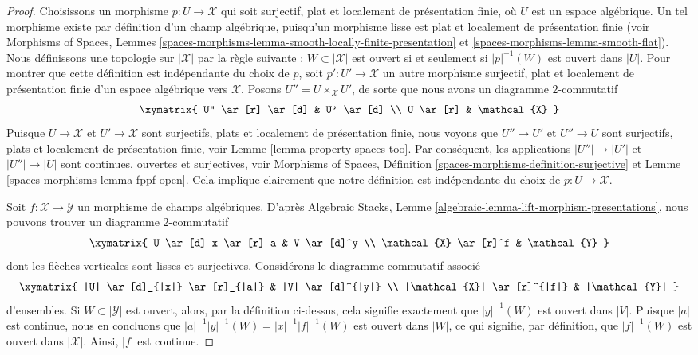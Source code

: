 \begin{proof}
Choisissons un morphisme $p : U \to \mathcal{X}$ qui soit
surjectif, plat et localement de présentation finie,
où $U$ est un espace algébrique. Un tel morphisme existe par définition d'un champ
algébrique, puisqu'un morphisme lisse est plat et localement de présentation finie
(voir
Morphisms of Spaces,
Lemmes \ref{spaces-morphisms-lemma-smooth-locally-finite-presentation} et
\ref{spaces-morphisms-lemma-smooth-flat}).
Nous définissons une topologie sur $|\mathcal{X}|$ par la règle suivante :
$W \subset |\mathcal{X}|$ est ouvert si et seulement si $|p|^{-1}(W)$ est ouvert
dans $|U|$. Pour montrer que cette définition est indépendante du choix de $p$, soit
$p' : U' \to \mathcal{X}$ un autre morphisme surjectif, plat et
localement de présentation finie d'un espace algébrique vers
$\mathcal{X}$. Posons $U'' = U \times_\mathcal{X} U'$,
de sorte que nous avons un diagramme $2$-commutatif
$$
\xymatrix{
U'' \ar[r] \ar[d] & U' \ar[d] \\
U \ar[r] & \mathcal{X}
}
$$
Puisque $U \to \mathcal{X}$ et $U' \to \mathcal{X}$ sont surjectifs, plats et
localement de présentation finie, nous voyons que $U'' \to U'$ et $U'' \to U$
sont surjectifs, plats et localement de présentation finie, voir
Lemme \ref{lemma-property-spaces-too}.
Par conséquent, les applications $|U''| \to |U'|$ et $|U''| \to |U|$ sont continues, ouvertes
et surjectives, voir
Morphisms of Spaces,
Définition \ref{spaces-morphisms-definition-surjective} et
Lemme \ref{spaces-morphisms-lemma-fppf-open}.
Cela implique clairement que notre définition est indépendante du choix
de $p : U \to \mathcal{X}$.

\medskip\noindent
Soit $f : \mathcal{X} \to \mathcal{Y}$ un morphisme de champs algébriques.
D'après
Algebraic Stacks, Lemme \ref{algebraic-lemma-lift-morphism-presentations},
nous pouvons trouver un diagramme $2$-commutatif
$$
\xymatrix{
U \ar[d]_x \ar[r]_a & V \ar[d]^y \\
\mathcal{X} \ar[r]^f & \mathcal{Y}
}
$$
dont les flèches verticales sont lisses et surjectives.
Considérons le diagramme commutatif associé
$$
\xymatrix{
|U| \ar[d]_{|x|} \ar[r]_{|a|} & |V| \ar[d]^{|y|} \\
|\mathcal{X}| \ar[r]^{|f|} & |\mathcal{Y}|
}
$$
d'ensembles. Si $W \subset |\mathcal{Y}|$ est ouvert, alors, par la définition
ci-dessus, cela signifie exactement que $|y|^{-1}(W)$ est ouvert dans $|V|$. Puisque
$|a|$ est continue, nous en concluons que
$|a|^{-1}|y|^{-1}(W) = |x|^{-1}|f|^{-1}(W)$ est ouvert dans $|W|$, ce qui signifie,
par définition, que $|f|^{-1}(W)$ est ouvert dans $|\mathcal{X}|$.
Ainsi, $|f|$ est continue.


\end{proof}
